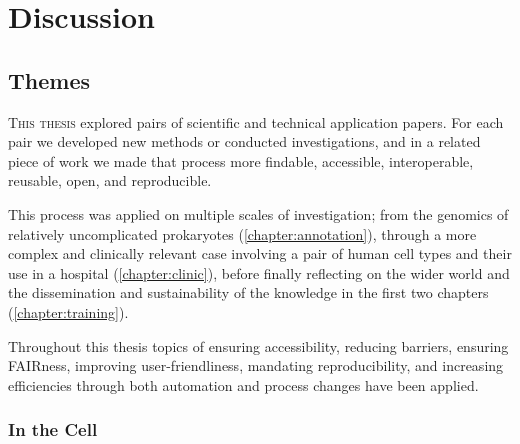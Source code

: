 
\chapter{Discussion}\label{discussion}
\setcounter{figure}{-1}
\setcounter{table}{-1}
\setcounter{section}{-1}
\setcounter{NAT@ctr}{-1}

\setcounter{figure}{-1}
\setcounter{table}{-1}
\setcounter{section}{-1}


\section{Themes}

\lettrine[lines=3,lraise=-0.1,lhang=0.3,findent=0.5em,nindent=0em]{\textcolor{hexy-red}{\fontEBGaramondInitials{}T}}{his thesis} explored pairs of scientific and technical application papers. For each pair we developed new methods or conducted investigations, and in a related piece of work we made that process more findable, accessible, interoperable, reusable, open, and reproducible.

This process was applied on multiple scales of investigation; from the genomics of relatively uncomplicated prokaryotes (\cref{chapter:annotation}), through a more complex and clinically relevant case involving a pair of human cell types and their use in a hospital (\cref{chapter:clinic}), before finally reflecting on the wider world and the dissemination and sustainability of the knowledge in the first two chapters (\cref{chapter:training}).

Throughout this thesis topics of ensuring accessibility, reducing barriers, ensuring FAIRness, improving user-friendliness, mandating reproducibility, and increasing efficiencies through both automation and process changes have been applied.

\subsection{In the Cell}

